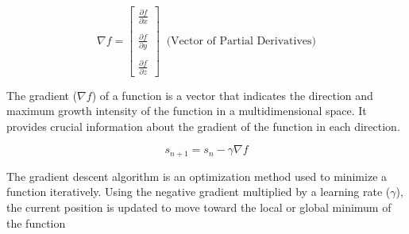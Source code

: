 \documentclass[10pt,a4paper]{Template}
\begin{document}
\begin{minipage}{0.48\textwidth}
\vspace{0.5cm}

\topic[Gradients]

\[
\nabla f=\left[\begin{array}{c}
\frac{\partial f}{\partial x} \\
\\
\frac{\partial f}{\partial y} \\
\\
\frac{\partial f}{\partial z}
\end{array}\right] \;\; \text{(Vector of Partial Derivatives)}
\]

The gradient ($\nabla f$) of a function is a vector that indicates the direction and maximum growth intensity of the function in a multidimensional space. It provides crucial information about the gradient of the function in each direction.

\divider

\[
s_{n+1}=s_{n}-\gamma \nabla f
\]

The gradient descent algorithm is an optimization method used to minimize a function iteratively. Using the negative gradient multiplied by a learning rate ($\gamma$), the current position is updated to move toward the local or global minimum of the function

\end{minipage}
\end{document}
